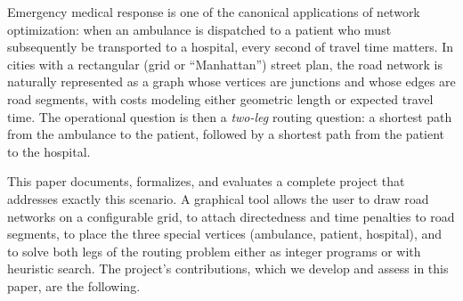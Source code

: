 \documentclass[10pt,twocolumn]{article}
\begin{document}
Emergency medical response is one of the canonical applications of network optimization:
when an ambulance is dispatched to a patient who must subsequently be transported to a
hospital, every second of travel time matters. In cities with a rectangular (grid or
``Manhattan'') street plan, the road network is naturally represented as a graph whose
vertices are junctions and whose edges are road segments, with costs modeling either
geometric length or expected travel time. The operational question is then a \emph{two-leg}
routing question: a shortest path from the ambulance to the patient, followed by a shortest
path from the patient to the hospital.

This paper documents, formalizes, and evaluates a complete project that addresses exactly
this scenario. A graphical tool allows the user to draw road networks on a configurable
grid, to attach directedness and time penalties to road segments, to place the three special
vertices (ambulance, patient, hospital), and to solve both legs of the routing problem either
as integer programs or with heuristic search. The project's contributions, which we develop
and assess in this paper, are the following.
\end{document}
